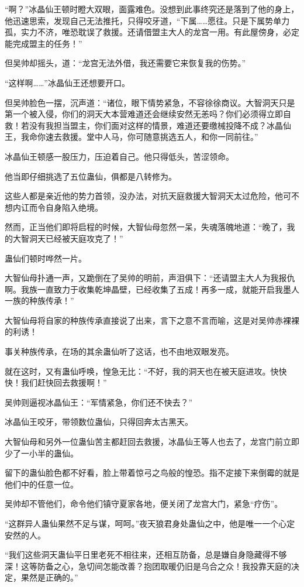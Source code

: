 \begin{this_body}
“啊？”冰晶仙王顿时瞪大双眼，面露难色。没想到此事终究还是落到了他的身上，他迅速思索，发现自己无法推托，只得咬牙道，“下属……愿往。只是下属势单力孤，实力不济，唯恐耽误了救援。还请借盟主大人的龙宫一用。有此屋傍身，必定能完成盟主的任务！”

但吴帅却摇头，道：“龙宫无法外借，我还需要它来恢复我的伤势。”

“这样啊……”冰晶仙王还想要开口。

但吴帅脸色一摆，沉声道：“诸位，眼下情势紧急，不容徐徐商议。大智洞天只是第一个被入侵，你们的洞天大本营难道还会继续安然无恙吗？你们必须得立即自救！若没有我担当盟主，你们面对这样的情景，难道还要缴械投降不成？冰晶仙王，我命你速去救援。堂中人马，你可随意挑选五人，和你一同前往。”

冰晶仙王顿感一股压力，压迫着自己。他只得低头，苦涩领命。

他当即仔细挑选了五位蛊仙，俱都是八转修为。

这些人都是亲近他的势力首领，没办法，对抗天庭救援大智洞天太过危险，他可不想内讧而令自身陷入绝境。

然而，正当他们即将启程的时候，大智仙母忽然一呆，失魂落魄地道：“晚了，我的大智洞天已经被天庭攻克了！”

蛊仙们顿时哗然一片。

大智仙母扑通一声，又跪倒在了吴帅的明前，声泪俱下：“还请盟主大人为我报仇啊。我族一直致力于收集乾坤晶壁，已经收集了五成！再多一成，就能开启我墨人一族的种族传承！”

大智仙母将自家的种族传承直接说了出来，言下之意不言而喻，这是对吴帅赤裸裸的利诱！

事关种族传承，在场的其余蛊仙听了这话，也不由地双眼发亮。

就在这时，又有蛊仙呼唤，惶急无比：“不好，我的洞天也在被天庭进攻。快快快！我们赶快回去救援啊！”

吴帅则逼视冰晶仙王：“军情紧急，你们还不快去？”

冰晶仙王咬牙，带领数位蛊仙，只得回奔太古黑天。

大智仙母和另外一位蛊仙苦主都赶回去救援，冰晶仙王等人也去了，龙宫门前立即少了一小半的蛊仙。

留下的蛊仙脸色都不好看，脸上带着惊弓之鸟般的惶恐。指不定接下来倒霉的就是他们中的任意一位。

吴帅却不管他们，命令他们镇守夏家各地，便关闭了龙宫大门，紧急“疗伤”。

“这群异人蛊仙果然不足与谋，呵呵。”夜天狼君身处蛊仙之中，他是唯一一个心定安然的人。

“我们这些洞天蛊仙平日里老死不相往来，还相互防备，总是嫌自身隐藏得不够深！这等防备之心，急切间怎能改善？抱团取暖仍旧是乌合之众！我投靠天庭的决定，果然是正确的。”


\end{this_body}
